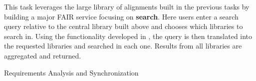 \begin{workpackage}[id=alignment,wphases=0-48,type=RTD,
  short=Concept Alignment,%
  title=Concept Alignment,
  lead=Pra,
  PraRM=10]
\begin{tasklist}
\begin{task}[id=alignsearch,title=FAIR Services: Search across Libraries,lead=FauRM,FauRM=12]
This task leverages the large library of alignments built in the previous tasks by building a major FAIR service focusing on \textbf{search}.
Here users enter a search query relative to the central library built above and chooses which libraries to search in.
Using the functionality developed in , the query is then translated into the requested libraries and searched in each one.
Results from all libraries are aggregated and returned.
\end{task}

\end{tasklist}

\begin{wpdelivs}
  \begin{wpdeliv}[due=3,miles=startup,id=requirements,dissem=PU,nature=DEM,lead=Inr]
      {Requirements Analysis and Synchronization}
\end{wpdeliv}
\end{wpdelivs}
\end{workpackage}

